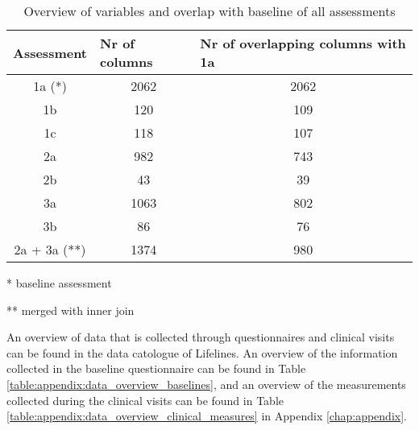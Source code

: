 \vspace{0.5cm}
\begin{table} [H]
    \centering
    \caption{Overview of variables and overlap with baseline of all assessments}
    \begin{tabular}{ccc}
        \hline
        \multicolumn{1}{l}{Assessment} & \multicolumn{1}{l}{Nr of columns} & \multicolumn{1}{l}{Nr of overlapping columns with 1a} \\ \hline
        1a (*)                             & 2062                              & 2062                                                                      \\
        1b                             & 120                               & 109                                                                       \\
        1c                             & 118                               & 107                                                                       \\
        2a                             & 982                               & 743                                                                       \\
        2b                             & 43                                & 39                                                                        \\
        3a                             & 1063                              & 802                                                                       \\
        3b                             & 86                                & 76                                                                        \\
        2a + 3a (**)                       & 1374                              & 980                                 
    \end{tabular}
    \begin{tablenotes}
        \small
        \item \hspace{1cm} * baseline assessment
        \item \hspace{1cm} ** merged with inner join
      \end{tablenotes}
    \label{table:data:variable_overview_before_preprocessing}
\end{table}

An overview of data that is collected through questionnaires and clinical visits can be found in the data catologue of Lifelines. An overview of the information collected in the baseline questionnaire can be found in Table \ref{table:appendix:data_overview_baselines}, and an overview of the measurements collected during the clinical visits can be found in Table \ref{table:appendix:data_overview_clinical_measures} in Appendix \ref{chap:appendix}. %

